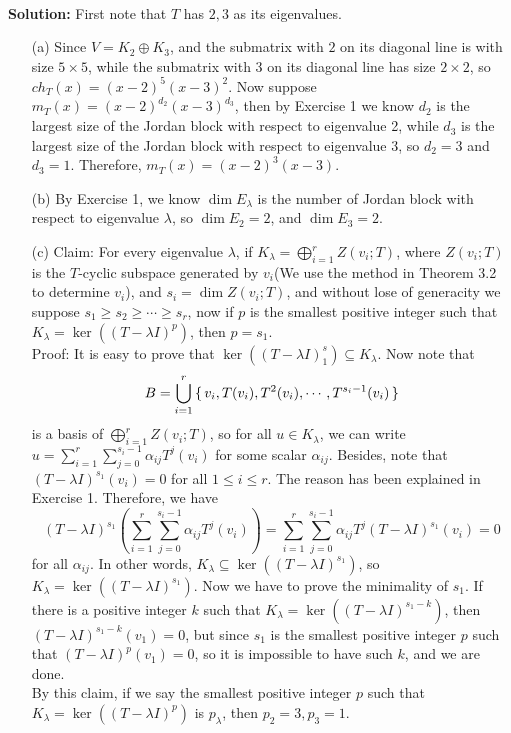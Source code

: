 \documentclass[a4paper]{article}
\theoremstyle{mystyle}
\newcommand{\6}{\partial}
\begin{document}
\hfill \\ \textbf{Solution: } First note that $T$ has $2, 3$ as its eigenvalues.
\begin{itemize}
    \item [(a)] Since $V= K_2 \oplus K_3$, and the submatrix with $2$ on its diagonal line is with size $5 \times 5$, while the
    submatrix with $3$ on its diagonal line has size $2 \times 2$, so $ch_T(x)=(x-2)^5(x-3)^2$. Now
    suppose $m_T(x)=(x-2)^{d_2}(x-3)^{d_3}$, then by Exercise 1 we know $d_2$ is the largest size of the Jordan block with respect to eigenvalue 2,
    while $d_3$ is the largest size of the Jordan block with respect to eigenvalue $3$, so $d_2=3$ and $d_3=1$.
    Therefore, $m_T(x)=(x-2)^3(x-3)$.
    \item [(b)] By Exercise 1, we know $\dim E_\lambda$ is the number of Jordan block with respect to eigenvalue $\lambda$, so
    $\dim E_2=2$, and $\dim E_3 = 2$.
    \item [(c)] Claim: For every eigenvalue $\lambda$, if $K_\lambda=\bigoplus_{i=1}^r Z(v_i;T)$, where $Z(v_i; T)$ is the 
    $T$-cyclic subspace generated by $v_i$(We use the method in Theorem 3.2 to determine $v_i$), and $s_i=\dim Z(v_i;T)$, and without lose of generacity we suppose
    $s_1 \ge s_2 \ge \cdots \ge s_r$, now if $p$ is the smallest
    positive integer such that $K_\lambda=\ker ((T-\lambda I)^p)$, then $p=s_1$. \\ 
    Proof: It is easy to prove that $\ker ((T-\lambda I)^s_1) \subseteq K_\lambda$. Now note that
    \[ B=\bigcup_{i=1}^r\set{v_i, T(v_i), T^2(v_i), \cdots , T^{s_i-1}(v_i)}\]
    is a basis of $\bigoplus_{i=1}^r Z(v_i;T)$, so for all $u \in K_\lambda$, we can write
    $u=\sum_{i=1}^r\sum_{j=0}^{s_i-1}\alpha_{ij}T^j(v_i)$ for some scalar $\alpha_{ij}$. Besides, note that $(T-\lambda I)^{s_1}(v_i)=0$ for all $1 \le i \le r$.
    The reason has been explained in Exercise 1. Therefore, we have 
    \[ 
    (T-\lambda I)^{s_1}\left(\sum_{i=1}^r\sum_{j=0}^{s_i-1}\alpha_{ij}T^j(v_i)\right)=\sum_{i=1}^r\sum_{j=0}^{s_i-1}\alpha_{ij}T^j(T-\lambda I)^{s_1}(v_i)=0
    \] for all $\alpha_{ij}$. In other words, $K_\lambda \subseteq \ker((T-\lambda I)^{s_1})$, so 
    $K_\lambda = \ker((T-\lambda I)^{s_1})$. Now we have to prove the minimality of $s_1$. If there is a positive integer 
    $k$ such that $K_\lambda=\ker((T-\lambda I)^{s_1-k})$, then $(T-\lambda I)^{s_1 - k}(v_1)=0$, but since $s_1$ is the smallest positive integer 
    $p$ such that $(T-\lambda I)^p(v_1)=0$, so it is impossible to have such $k$, and we are done. \\
    By this claim, if we say the smallest positive integer $p$ such that $K_\lambda=\ker((T-\lambda I)^p)$ is $p_\lambda$, then
    $p_2=3, p_3=1$.
\end{itemize}
\end{document}
